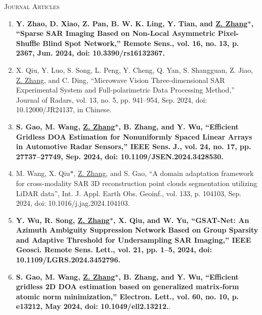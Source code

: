 \documentclass[paper=a4,fontsize=11pt]{scrartcl}
\begin{document}
%
%

\textsc{Journal Articles}

\begin{enumerate}
	
\item \textbf{Y. Zhao, D. Xiao, Z. Pan, B. W. K. Ling, Y. Tian, and \underline{Z. Zhang$\ast$}, ``Sparse SAR Imaging Based on Non-Local Asymmetric Pixel-Shuffle Blind Spot Network,'' Remote Sens., vol. 16, no. 13, p. 2367, Jun. 2024, doi: 10.3390/rs16132367.}

\item X. Qiu, Y. Luo, S. Song, L. Peng, Y. Cheng, Q. Yan, S. Shangguan, Z. Jiao, \underline{Z. Zhang}, and C. Ding, ``Microwave Vision Three-dimensional SAR Experimental System and Full-polarimetric Data Processing Method,'' Journal of Radars, vol. 13, no. 5, pp. 941–954, Sep. 2024, doi: 10.12000/JR24137, in Chinese.

\item \textbf{S. Gao, M. Wang, \underline{Z. Zhang$\ast$}, B. Zhang, and Y. Wu, ``Efficient Gridless DOA Estimation for Nonuniformly Spaced Linear Arrays in Automotive Radar Sensors,'' IEEE Sens. J., vol. 24, no. 17, pp. 27737–27749, Sep. 2024, doi: 10.1109/JSEN.2024.3428530.}

\item M. Wang, X. Qiu$\ast$, \underline{Z. Zhang}, and S. Gao, ``A domain adaptation framework for cross-modality SAR 3D reconstruction point clouds segmentation utilizing LiDAR data'', Int. J. Appl. Earth Obs. Geoinf., vol. 133, p. 104103, Sep. 2024, doi: 10.1016/j.jag.2024.104103.

\item \textbf{Y. Wu, R. Song, \underline{Z. Zhang$\ast$}, X. Qiu, and W. Yu, ``GSAT-Net: An Azimuth Ambiguity Suppression Network Based on Group Sparsity and Adaptive Threshold for Undersampling SAR Imaging,'' IEEE Geosci. Remote Sens. Lett., vol. 21, pp. 1–5, 2024, doi: 10.1109/LGRS.2024.3452796.}

\item \textbf{S. Gao, M. Wang, \underline{Z. Zhang$\ast$}, B. Zhang, and Y. Wu, 	``Efficient gridless 2D DOA estimation based on generalized matrix‐form atomic norm minimization,'' Electron. Lett., vol. 60, no. 10, p. e13212, May 2024, doi: 10.1049/ell2.13212.}.


\end{enumerate}
\end{document}

